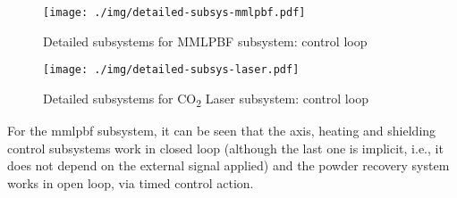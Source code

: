 \begin{figure}[!hbt]
  \centering
    \texttt{[image: ./img/detailed-subsys-mmlpbf.pdf]}
  \caption{Detailed subsystems for MMLPBF subsystem: control loop}%
  \label{fig:detailed-subsys-mms}
\end{figure}

\begin{figure}[!hbt]
  \centering
    \texttt{[image: ./img/detailed-subsys-laser.pdf]}
  \caption{Detailed subsystems for CO\textsubscript{2} Laser subsystem: control loop}\label{fig:detailed-subsys-laser}
\end{figure}

For the \gls{mmlpbf} subsystem, it can be seen that the axis, heating and
shielding control subsystems work in closed loop (although the last one is
implicit, i.e., it does not depend on the external signal applied) and the
powder recovery system works in open loop, via timed control action. 
